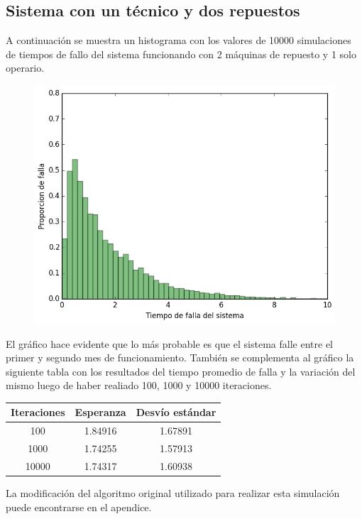 \documentclass[10pt,a4paper]{article} %
\begin{document}
    \subsection{Sistema con un t\'ecnico y dos repuestos}
    A continuaci\'on se muestra un histograma con los valores de 10000 simulaciones de tiempos de fallo del sistema funcionando con 2 m\'aquinas de repuesto y 1 solo operario.
    \begin {figure}[!htb]
    \centering
    \includegraphics[width=12cm] {img/1op2rep}
    \end {figure}
    
    El gr\'afico hace evidente que lo m\'as probable es que el sistema falle entre el primer y segundo mes de funcionamiento. Tambi\'en se complementa al gr\'afico la siguiente tabla con los resultados del tiempo promedio de falla y la variaci\'on del mismo luego de haber realiado 100, 1000 y 10000 iteraciones.
    
    \begin{center}
        \begin{tabular}{ c| c| c}
            Iteraciones & Esperanza & Desv\'io est\'andar \\ \hline
            100&    1.84916 & 1.67891 \\ \hline
            1000&   1.74255 & 1.57913 \\ \hline
            10000&  1.74317 & 1.60938 \\ \hline
        \end{tabular}
    \end{center}
    
    La modificaci\'on del algoritmo original utilizado para realizar esta simulaci\'on puede encontrarse en el apendice.
    
\end{document}

